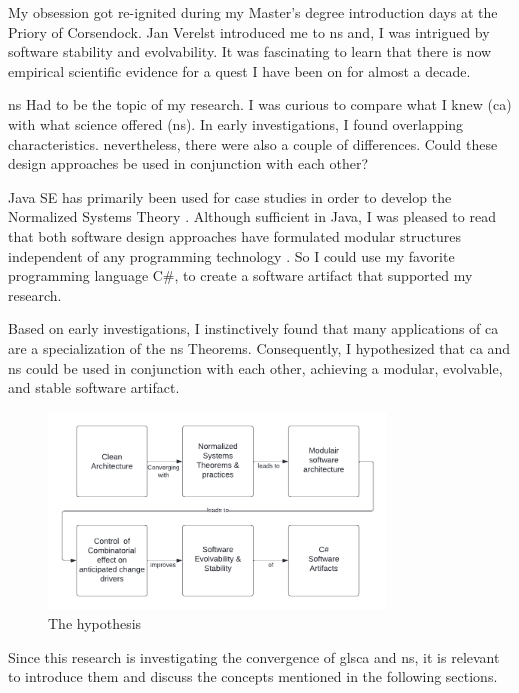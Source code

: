 My obsession got re-ignited during my Master's degree introduction days at the Priory of
Corsendock. Jan Verelst introduced me to \gls{ns} and, I was intrigued by software
stability and evolvability. It was fascinating to learn that there is now empirical
scientific evidence for a quest I have been on for almost a decade. 

\gls{ns} Had to be the topic of my research. I was curious to compare what I knew
(\gls{ca}) with what science offered (\gls{ns}). In early investigations, I found
overlapping characteristics. nevertheless, there were also a couple of differences. Could
these design approaches be used in conjunction with each other?

Java SE has primarily been used for case studies in order to develop the Normalized
Systems Theory \parencite{oorts_building_2014, de_bruyn_enabling_2018}. Although
sufficient in Java, I was pleased to read that both software design approaches have
formulated modular structures independent of any programming technology
\parencite{mannaert_normalized_2009,robert_c_martin_clean_2018}. So I could use my
favorite programming language C\#, to create a software artifact that supported my
research. 

Based on early investigations, I instinctively found that many applications of \gls{ca} are
a specialization of the \gls{ns} Theorems. Consequently, I hypothesized that \gls{ca} and
\gls{ns} could be used in conjunction with each other, achieving a modular, evolvable, and
stable software artifact.

\begin{figure}[H]
    \centering
    \includegraphics[width=0.8\textwidth]{figures/hypothesis.pdf}
    \caption[The hypothesis]{The hypothesis}
    \label{fig_hypothesis}
\end{figure}

Since this research is investigating the convergence of gls{ca} and \gls{ns}, it is
relevant to introduce them and discuss the concepts mentioned in the following sections.





